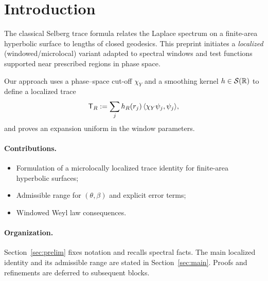\section{Introduction}

The classical Selberg trace formula relates the Laplace spectrum on a finite-area hyperbolic surface to lengths of closed geodesics.  
This preprint initiates a \emph{localized} (windowed/microlocal) variant adapted to spectral windows and test functions supported near prescribed regions in phase space.

Our approach uses a phase–space cut-off $\chi_Y$ and a smoothing kernel $h\in\mathcal S(\mathbb{R})$ to define a localized trace
\[
  \mathsf{T}_R := \sum_j h_R(r_j)\,\langle \chi_Y \psi_j,\psi_j\rangle,
\]
and proves an expansion uniform in the window parameters.

\paragraph{Contributions.}
\begin{itemize}
  \item Formulation of a microlocally localized trace identity for finite-area hyperbolic surfaces;
  \item Admissible range for $(\theta,\beta)$ and explicit error terms;
  \item Windowed Weyl law consequences.
\end{itemize}

\paragraph{Organization.}
Section~\ref{sec:prelim} fixes notation and recalls spectral facts.
The main localized identity and its admissible range are stated in Section~\ref{sec:main}.
Proofs and refinements are deferred to subsequent blocks.
